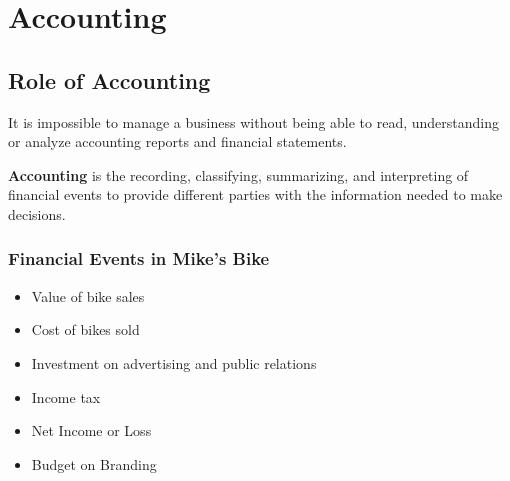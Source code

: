 \documentclass[english, 12pt]{article}
\begin{document}
\section{Accounting}
\subsection{Role of Accounting}
It is impossible to manage a business without being able to read, understanding or analyze accounting reports and financial statements.
\begin{defn}
\textbf{Accounting} is the recording, classifying, summarizing, and interpreting of financial events to provide different parties with the information needed to make decisions.
\end{defn}
\subsubsection*{Financial Events in Mike's Bike}
\begin{itemize}
\item Value of bike sales
\item Cost of bikes sold
\item Investment on advertising and public relations
\item Income tax
\item Net Income or Loss
\item Budget on Branding
\end{itemize}
\end{document}
